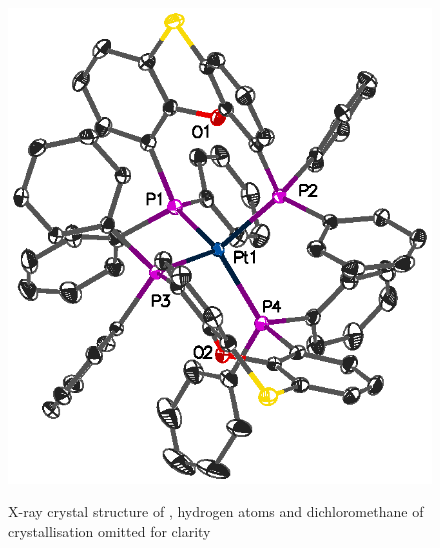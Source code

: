 \begin{figure}[ht]
\begin{center}
\vspace{0.5cm}
\includegraphics[scale=1.1]{../Figures/CrystalPtSPh2.eps}
\caption[X-ray crystal structure of \ce{[Pt(Ph-thixantphos)2]}]{X-ray crystal structure of \ce{[Pt(Ph-thixantphos)2]}, hydrogen atoms and dichloromethane of crystallisation omitted for clarity}
\vspace{0.2cm}
\label{crystalbisthixantphosplatinum}
\end{center}
\end{figure}
\vspace{0.2cm}

